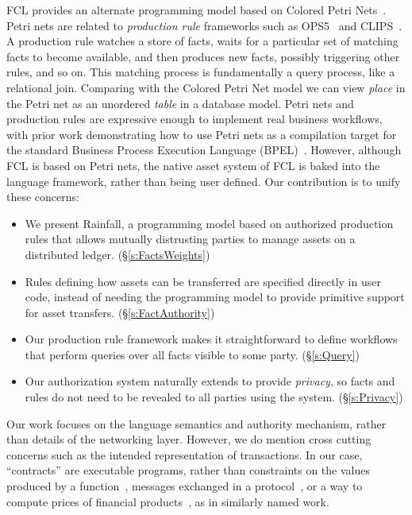 FCL provides an alternate programming model based on Colored Petri Nets~\cite{Jensen1981:ColouredPetri}. Petri nets are related to \emph{production rule} frameworks such as OPS5~\cite{Forgy1981:OPS5} and CLIPS~\cite{Riley2017:CLIPS}. A production rule watches a store of facts, waits for a particular set of matching facts to become available, and then produces new facts, possibly triggering other rules, and so on. This matching process is fundamentally a query process, like a relational join. Comparing with the Colored Petri Net model we can view \emph{place} in the Petri net as an unordered \emph{table} in a database model. Petri nets and production rules are expressive enough to implement real business workflows, with prior work demonstrating how to use Petri nets as a compilation target for the standard Business Process Execution Language (BPEL)~\cite{Lohmann2009:PetriBPEL}.  However, although FCL is based on Petri nets, the native asset system of FCL is baked into the language framework, rather than being user defined. Our contribution is to unify these concerns:


\begin{itemize}
\item We present Rainfall, a programming model based on authorized production rules that allows mutually distrusting parties to manage assets on a distributed ledger. (\S\ref{s:FactsWeights})

\item Rules defining how assets can be transferred are specified directly in user code, instead of needing the programming model to provide primitive support for asset transfers. (\S\ref{s:FactAuthority})

\item Our production rule framework makes it straightforward to define workflows that perform queries over all facts visible to some party. (\S\ref{s:Query})

\item Our authorization system naturally extends to provide \emph{privacy}, so facts and rules do not need to be revealed to all parties using the system. (\S\ref{s:Privacy})

\end{itemize}

Our work focuses on the language semantics and authority mechanism, rather than details of the networking layer. However, we do mention cross cutting concerns such as the intended representation of transactions. In our case, ``contracts'' are executable programs, rather than constraints on the values produced by a function~\cite{Findler2002:Contracts}, messages exchanged in a protocol~\cite{Das2019:Resource, Deon2019:CSL}, or a way to compute prices of financial products~\cite{PeytonJones2000:Composing}, as in similarly named work.




